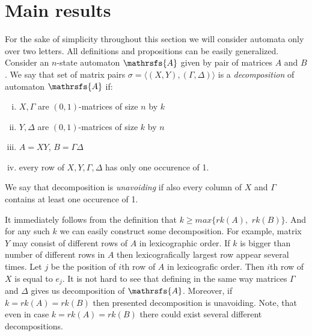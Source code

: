 \documentclass[11pt]{llncs}
\newcommand{\A}{\mathrsfs{A}}
\newcommand{\G}{\Gamma}
\newcommand{\D}{\Delta}
\newcommand{\rk}{rk}
\begin{document}
\section{Main results}
For the sake of simplicity throughout this section we will consider automata only
over two letters. All definitions and propositions can be easily generalized.
Consider an $n$-state automaton $\A$ given by pair of matrices $A$ and $B$.
We say that set of matrix pairs $\sigma = \langle(X,Y), (\G,\D)\rangle$ is
a \emph{decomposition} of automaton $\A$ if:
\begin{enumerate}[(i)]
\item $X, \G$ are $(0,1)$-matrices of size $n$ by $k$
\item $Y, \D$ are $(0,1)$-matrices of size $k$ by $n$
\item $A = XY$, $B = \G\D$
\item every row of $X,Y,\G,\D$ has only one occurence of 1.
\end{enumerate}
We say that decomposition is \emph{unavoiding} if also every column of $X$ and 
$\G$ contains at least one occurence of 1.

It immediately follows from the definition that $k \geq max\{\rk(A),$ $\rk(B)\}$.
And for any such $k$ we can easily construct some decomposition. 
For example, matrix $Y$ may consist of different rows of $A$ in lexicographic order.
If $k$ is bigger than number of different rows in $A$ then lexicografically largest row 
appear several times. Let $j$ be the position of $i$th row of $A$ in lexicografic order.
Then $i$th row of $X$ is equal to $e_j$. It is not hard to see that defining in the 
same way matrices $\G$ and $\D$ gives us decomposition of $\A$. Moreover,
if $k = \rk(A) = \rk(B)$ then presented decomposition is unavoiding. Note, that even in case
$k = \rk(A) = \rk(B)$ there could exist several different decompositions.
\end{document}
